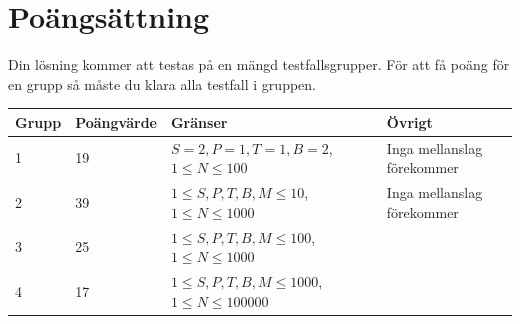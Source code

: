 \section*{Poängsättning}
Din lösning kommer att testas på en mängd testfallsgrupper. För att få poäng för en grupp
så måste du klara alla testfall i gruppen.
\begin{tabular}{| l | l | l | l |}
\hline
Grupp & Poängvärde & Gränser & Övrigt \\ \hline
1     & 19         &  $S = 2, P = 1, T = 1, B = 2$, $1 \le N \le 100$  & Inga mellanslag förekommer\\ \hline
2     & 39         &  $1 \le S, P, T, B, M \le 10$, $1 \le N \le 1000$ & Inga mellanslag förekommer \\ \hline
3     & 25         &  $1 \le S, P, T, B, M \le 100$, $1 \le N \le 1000$    & \\ \hline
4     & 17        &  $1 \le S, P, T, B, M \le 1000$, $1 \le N \le 100000$  & \\ \hline
\end{tabular}
